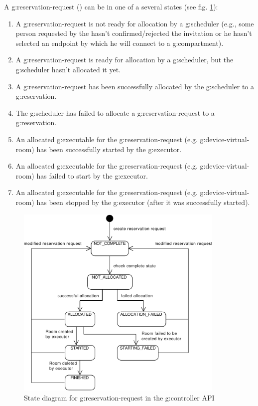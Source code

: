 A \gls{g:reservation-request} () can be in one of a several states (see fig. \ref{fig:smd_api_reservation_request}):
\begin{enumerate}
\item {} A \gls{g:reservation-request} is not ready for allocation by a \gls{g:scheduler} (e.g., some person requested by the  hasn't confirmed/rejected the invitation or he hasn't selected an endpoint by which he will connect to a \gls{g:compartment}).
\item {} A \gls{g:reservation-request} is ready for allocation by a \gls{g:scheduler}, but the \gls{g:scheduler} hasn't allocated it yet.
\item {} A \gls{g:reservation-request} has been successfully allocated by the \gls{g:scheduler} to a \gls{g:reservation}.
\item {} The \gls{g:scheduler} has failed to allocate a \gls{g:reservation-request} to a \gls{g:reservation}.
\item {} An allocated \gls{g:executable} for the \gls{g:reservation-request} (e.g. \gls{g:device-virtual-room}) has been successfully started by the \gls{g:executor}.
\item {} An allocated \gls{g:executable} for the \gls{g:reservation-request} (e.g. \gls{g:device-virtual-room}) has failed to start by the \gls{g:executor}.
\item {} An allocated \gls{g:executable} for the \gls{g:reservation-request} (e.g. \gls{g:device-virtual-room}) has been stopped by the \gls{g:executor} (after it was successfully started).

\end{enumerate}

\begin{figure}[ht!]
\centering\includegraphics[width=10cm]{diagrams/smd_api_reservation_request}
\caption{State diagram for \gls{g:reservation-request} in the \gls{g:controller} API}
\label{fig:smd_api_reservation_request}
\end{figure}

